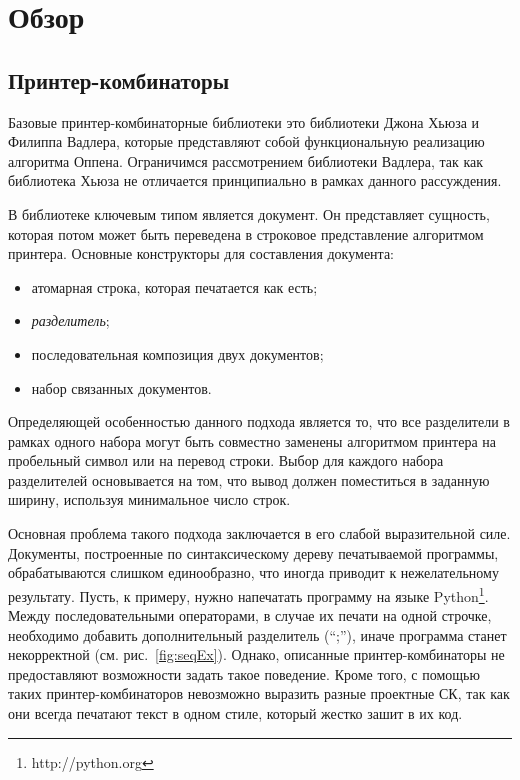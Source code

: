 \section{Обзор}

\subsection{Принтер-комбинаторы}

Базовые принтер-комбинаторные библиотеки это библиотеки
Джона Хьюза\cite{hughes} и Филиппа Вадлера\cite{wadler}, которые
представляют собой функциональную реализацию алгоритма
Оппена\cite{oppen}.
Ограничимся рассмотрением библиотеки Вадлера, так как
библиотека Хьюза не отличается принципиально
в рамках данного рассуждения.

В библиотеке ключевым типом является документ.
Он представляет сущность, которая потом может
быть переведена в строковое представление алгоритмом принтера.
Основные конструкторы для составления документа:
\begin{itemize}
  \item атомарная строка, которая печатается как есть;
  \item \emph{разделитель};
  \item последовательная композиция двух документов;
  \item набор связанных документов.
\end{itemize}

Определяющей особенностью данного подхода является то, что все разделители
в рамках одного набора могут быть совместно заменены алгоритмом принтера
на пробельный символ или на перевод строки. Выбор для каждого набора разделителей
основывается на том, что вывод должен поместиться в заданную ширину,
используя минимальное число строк.

Основная проблема такого подхода заключается в его слабой выразительной силе.
Документы, построенные по синтаксическому дереву печатываемой программы,
обрабатываются слишком единообразно, что иногда приводит к нежелательному результату.
Пусть, к примеру, нужно напечатать программу на языке Python\footnote{http://python.org}.
Между последовательными операторами, в случае их печати на одной строчке, необходимо
добавить дополнительный разделитель (``;''), иначе программа станет некорректной
(см. рис.~\ref{fig:seqEx}). Однако, описанные принтер-комбинаторы не предоставляют
возможности задать такое поведение.
Кроме того, с помощью таких принтер-комбинаторов невозможно выразить разные проектные СК,
так как они всегда печатают текст в одном стиле, который жестко зашит в их код.

